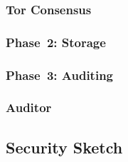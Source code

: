 \subsubsection{Tor Consensus}

\subsubsection{Phase~2: Storage}

\subsubsection{Phase~3: Auditing}


%
%
%
%

\subsubsection{Auditor}

\subsection{Security Sketch}

%
%

%
%
